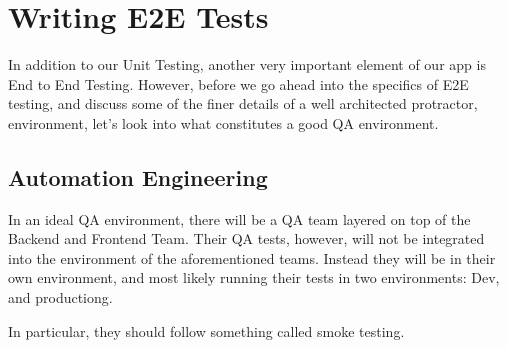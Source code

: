 \maketitle{}
\section{ Writing E2E Tests }

In addition to our Unit Testing, another very important element of our app is
End to End Testing. However, before we go ahead into the specifics of E2E
testing, and discuss some of the finer details of a well architected protractor,
environment, let's look into what constitutes a good QA environment.

\subsection{ Automation Engineering }
In an ideal QA environment, there will be a QA team layered on top of the
Backend and Frontend Team. Their QA tests, however, will not be integrated into
the environment of the aforementioned teams. Instead they will be in their own
environment, and most likely running their tests in two environments: Dev, and
productiong.

In particular, they should follow something called smoke testing.


